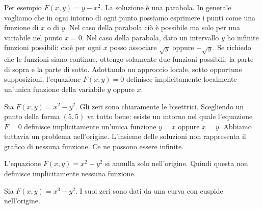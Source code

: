 \documentclass[a4paper]{article}
\begin{document}
\begin{radioactive}
Per esempio \(F(x,y) = y - x^2\). La soluzione è una parabola.
In generale vogliamo che in ogni intorno di ogni punto possiamo
esprimere i punti come una funzione di \(x\) o di \(y\).
Nel caso della parabola ciò è possibile ma solo per una variabile
nel punto \(x=0\).
Nel caso della parabola, dato un intervallo \(y\) ho infinite funzioni possibili:
cioè per ogni \(x\) posso associare \(\sqrt{y}\) oppure \(-\sqrt{y}\).
Se richiedo che le funzioni siano continue, ottengo solamente due funzioni possibili:
la parte di sopra e la parte di sotto.
Adottando un approccio locale, sotto opportune supposizioni,
l'equazione \(F(x,y) = 0\) definisce implicitamente
localmente un'unica funzione della variabile \(y\) oppure \(x\).
\end{radioactive}

\begin{radioactive}
\begin{snippetexample}{}
    Sia \(F(x,y) = x^2 - y^2\). Gli zeri sono chiaramente le bisettrici.
    Scegliendo un punto della forma \((5,5)\) va tutto bene:
    esiste un intorno nel quale l'equazione \(F=0\)
    definisce implicitamente un'unica funzione \(y=x\) oppure \(x=y\).
    Abbiamo tuttavia un problema nell'origine.
    L'insieme delle soluzioni non rappresenta il grafico di nessuna funzione.
    Ce ne possono essere infinite.
\end{snippetexample}

\begin{snippetexample}{}
    L'equazione \(F(x,y) = x^2 + y^2\)
    si annulla solo nell'origine. Quindi questa non definisce implicitamente
    nessuna funzione.
\end{snippetexample}

\begin{snippetexample}{}
    Sia \(F(x,y) = x^3 - y^2\).
    I suoi zeri sono dati da una curva con cuspide nell'origine.
\end{snippetexample}
\end{radioactive}
\end{document}
